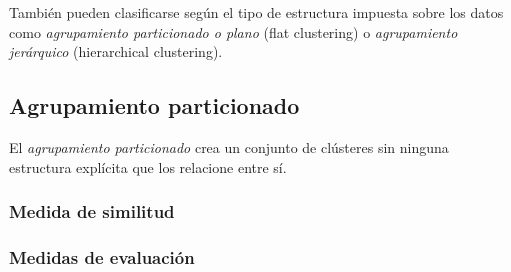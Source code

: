\documentclass{llncs}
\begin{document}
Tambi\'en pueden clasificarse seg\'un el tipo de estructura impuesta sobre los datos como \textit{agrupamiento particionado o plano} (flat clustering) o \textit{agrupamiento jer\'arquico} (hierarchical clustering).

\subsection{Agrupamiento particionado}

El \textit{agrupamiento particionado} crea un conjunto  de clústeres sin ninguna estructura explícita que los relacione entre sí. 

\subsubsection{Medida de similitud}

\subsubsection{Medidas de evaluaci\'on}
\end{document}
